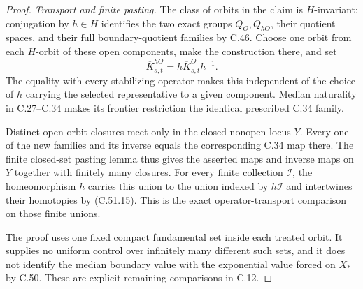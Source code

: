\begin{proof}
\emph{Transport and finite pasting.}
The class of orbits in the claim is $H$-invariant:
conjugation by $h\in H$ identifies the two exact
groups $Q_O,Q_{hO}$, their quotient spaces, and
their full boundary-quotient families by C.46.
Choose one orbit from each $H$-orbit of these open
components, make the construction there, and set
\[
             \overline K^{hO}_{s,t}
                   =h\overline K^O_{s,t}h^{-1}.
                                                        \tag{C.51.15}
\]
The equality with every stabilizing operator makes
this independent of the choice of $h$ carrying the
selected representative to a given component.
Median naturality in C.27--C.34 makes its frontier
restriction the identical prescribed C.34 family.

Distinct open-orbit closures meet only in the
closed nonopen locus $Y$. Every one of the new
families and its inverse equals the corresponding
C.34 map there. The finite closed-set pasting
lemma thus gives the asserted maps and inverse
maps on $Y$ together with finitely many closures.
For every finite collection $\mathcal I$, the
homeomorphism $h$ carries this union to the union
indexed by $h\mathcal I$ and intertwines their
homotopies by (C.51.15). This is the exact
operator-transport comparison on those finite unions.

The proof uses one fixed compact fundamental set
inside each treated orbit. It supplies no uniform
control over infinitely many different such sets,
and it does not identify the median boundary value
with the exponential value forced on $X_*$ by C.50.
These are explicit remaining comparisons in C.12.
\end{proof}
